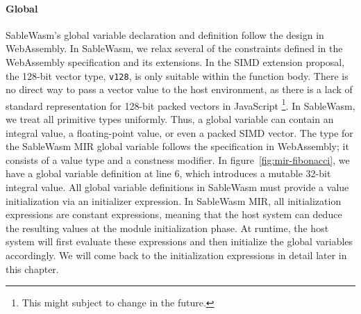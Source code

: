\paragraph{Global}
SableWasm's global variable declaration and definition follow the design in
WebAssembly. In SableWasm, we relax several of the constraints defined in the
WebAssembly specification and its extensions. In the SIMD extension proposal,
the 128-bit vector type, \texttt{v128}, is only suitable within the function
body. There is no direct way to pass a vector value to the host environment, as
there is a lack of standard representation for 128-bit packed vectors in
JavaScript \footnote{This might subject to change in the future.}. In SableWasm,
we treat all primitive types uniformly. Thus, a global variable can contain an
integral value, a floating-point value, or even a packed SIMD vector. The type
for the SableWasm MIR global variable follows the specification in WebAssembly;
it consists of a value type and a constness modifier. In
figure~\ref{fig:mir-fibonacci}, we have a global variable definition at line 6,
which introduces a mutable 32-bit integral value. All global variable
definitions in SableWasm must provide a value initialization via an initializer
expression. In SableWasm MIR, all initialization expressions are constant
expressions, meaning that the host system can deduce the resulting values at the
module initialization phase. At runtime, the host system will first evaluate
these expressions and then initialize the global variables accordingly.
We will come back to the initialization expressions in detail later in this
chapter.

